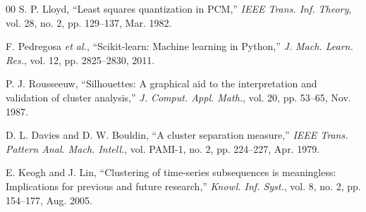\documentclass[conference]{IEEEtran}
\begin{document}
\begin{thebibliography}{00}
S. P. Lloyd, ``Least squares quantization in PCM,'' \textit{IEEE Trans. Inf. Theory}, vol. 28, no. 2, pp. 129--137, Mar. 1982.

F. Pedregosa \textit{et al.}, ``Scikit-learn: Machine learning in Python,'' \textit{J. Mach. Learn. Res.}, vol. 12, pp. 2825--2830, 2011.

P. J. Rousseeuw, ``Silhouettes: A graphical aid to the interpretation and validation of cluster analysis,'' \textit{J. Comput. Appl. Math.}, vol. 20, pp. 53--65, Nov. 1987.

D. L. Davies and D. W. Bouldin, ``A cluster separation measure,'' \textit{IEEE Trans. Pattern Anal. Mach. Intell.}, vol. PAMI-1, no. 2, pp. 224--227, Apr. 1979.

E. Keogh and J. Lin, ``Clustering of time-series subsequences is meaningless: Implications for previous and future research,'' \textit{Knowl. Inf. Syst.}, vol. 8, no. 2, pp. 154--177, Aug. 2005.

\end{thebibliography}
\end{document}
